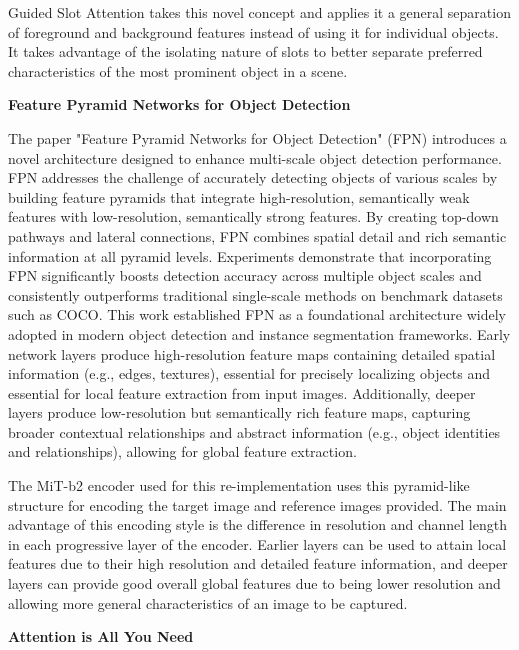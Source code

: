 \documentclass{article}
\theoremstyle{plain}
\theoremstyle{definition}
\theoremstyle{remark}
\begin{document}
\hspace{20pt} Guided Slot Attention takes this novel concept and applies it a general separation of foreground and background features instead of using it for individual objects. It takes advantage of the isolating nature of slots to better separate preferred characteristics of the most prominent object in a scene.

\textbf{Feature Pyramid Networks for Object Detection}

\hspace{20pt} The paper "Feature Pyramid Networks for Object Detection" (FPN) introduces a novel architecture designed to enhance multi-scale object detection performance. FPN addresses the challenge of accurately detecting objects of various scales by building feature pyramids that integrate high-resolution, semantically weak features with low-resolution, semantically strong features. By creating top-down pathways and lateral connections, FPN combines spatial detail and rich semantic information at all pyramid levels. Experiments demonstrate that incorporating FPN significantly boosts detection accuracy across multiple object scales and consistently outperforms traditional single-scale methods on benchmark datasets such as COCO. This work established FPN as a foundational architecture widely adopted in modern object detection and instance segmentation frameworks. Early network layers produce high-resolution feature maps containing detailed spatial information (e.g., edges, textures), essential for precisely localizing objects and essential for local feature extraction from input images. Additionally, deeper layers produce low-resolution but semantically rich feature maps, capturing broader contextual relationships and abstract information (e.g., object identities and relationships), allowing for global feature extraction.

\hspace{20pt} The MiT-b2 encoder used for this re-implementation uses this pyramid-like structure for encoding the target image and reference images provided. The main advantage of this encoding style is the difference in resolution and channel length in each progressive layer of the encoder. Earlier layers can be used to attain local features due to their high resolution and detailed feature information, and deeper layers can provide good overall global features due to being lower resolution and allowing more general characteristics of an image to be captured.

\textbf{Attention is All You Need}
\end{document}
